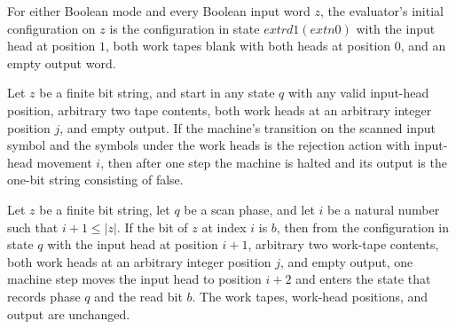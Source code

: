 \begin{theorem}
\label{BoolCircuit.CircuitEval.init_eq}
\leanok
{}
For either Boolean mode and every Boolean input word $z$, the evaluator's initial
configuration on $z$ is the configuration in state $	ext{rd1}(	ext{n0})$ with the input
head at position $1$, both work tapes blank with both heads at position $0$, and an
empty output word.
\end{theorem}

\begin{theorem}
\label{BoolCircuit.CircuitEval.step_rej}
\leanok
{}
Let $z$ be a finite bit string, and start in any state $q$ with any valid input-head
position, arbitrary two tape contents, both work heads at an arbitrary integer position
$j$, and empty output. If the machine's transition on the scanned input symbol and the
symbols under the work heads is the rejection action with input-head movement $i$, then
after one step the machine is halted and its output is the one-bit string consisting of
false.
\end{theorem}

\begin{theorem}
\label{BoolCircuit.CircuitEval.step_rd1}
\leanok
{}
Let $z$ be a finite bit string, let $q$ be a scan phase, and let $i$ be a natural number
such that $i+1\le |z|$. If the bit of $z$ at index $i$ is $b$, then from the
configuration in state $q$ with the input head at position $i+1$, arbitrary two
work-tape contents, both work heads at an arbitrary integer position $j$, and empty
output, one machine step moves the input head to position $i+2$ and enters the state
that records phase $q$ and the read bit $b$. The work tapes, work-head positions, and
output are unchanged.
\end{theorem}

